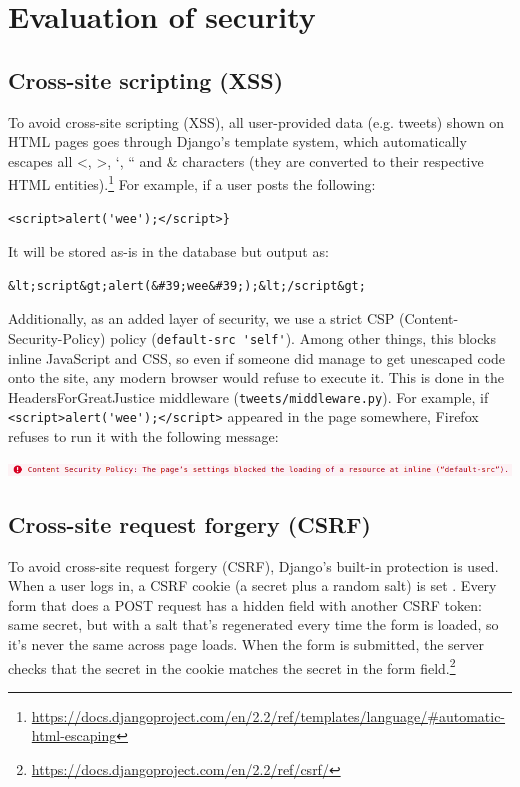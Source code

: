 \documentclass[11pt,english]{article}
\begin{document}
\section{Evaluation of security}

\subsection{Cross-site scripting (XSS)}

To avoid cross-site scripting (XSS), all user-provided data (e.g. tweets) shown on HTML pages goes through Django’s template system, which automatically escapes all <, >, ‘, “ and \& characters (they are converted to their respective HTML entities).\footnote{\url{https://docs.djangoproject.com/en/2.2/ref/templates/language/\#automatic-html-escaping}} For example, if a user posts the following:

\begin{verbatim}
<script>alert('wee');</script>}
\end{verbatim}

It will be stored as-is in the database but output as:

\begin{verbatim}
&lt;script&gt;alert(&#39;wee&#39;);&lt;/script&gt;
\end{verbatim}

Additionally, as an added layer of security, we use a strict CSP (Content-Security-Policy) policy (\lstinline{default-src 'self'}). Among other things, this blocks inline JavaScript and CSS, so even if someone did manage to get unescaped code onto the site, any modern browser would refuse to execute it. This is done in the HeadersForGreatJustice middleware (\lstinline{tweets/middleware.py}). For example, if \lstinline{<script>alert('wee');</script>} appeared in the page somewhere, Firefox refuses to run it with the following message:

\includegraphics[width=\textwidth]{csp_violation}

\subsection{Cross-site request forgery (CSRF)}

To avoid cross-site request forgery (CSRF), Django’s built-in protection is used. When a user logs in, a CSRF cookie (a secret plus a random salt) is set . Every form that does a POST request has a hidden field with another CSRF token: same secret, but with a salt that’s regenerated every time the form is loaded, so it’s never the same across page loads. When the form is submitted, the server checks that the secret in the cookie matches the secret in the form field.\footnote{\url{https://docs.djangoproject.com/en/2.2/ref/csrf/}}
\end{document}
